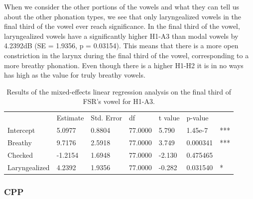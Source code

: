 \documentclass[12pt, letterpaper]{article}
\providecommand{\lsptoprule}{\midrule\toprule}
\providecommand{\lspbottomrule}{\bottomrule\midrule}
\begin{document}
When we consider the other portions of the vowels and what they can tell us about the other phonation types, we see that only laryngealized vowels in the final third of the vowel ever reach significance. In the final third of the vowel, laryngealized vowels have a significantly higher H1-A3 than modal vowels by 4.2392dB (SE = 1.9356, p = 0.03154). This means that there is a more open constriction in the larynx during the final third of the vowel, corresponding to a more breathy phonation. Even though there is a higher H1-H2 it is in no ways has high as the value for truly breathy vowels. 

\begin{table}[!h]
    \centering
    \caption{Results of the mixed-effects linear regression analysis on the final third of FSR's vowel for H1-A3. }
    \label{tab:FSR_H1A3_Third}
    \begin{tabular}{lllllll}
	\lsptoprule
					&  Estimate  & Std. Error & df & t value & p-value & \\
        Intercept       &   5.0977  & 0.8804 & 77.0000 &  5.790  &  1.45e-7 & *** \\  
  	Breathy   		&   9.7176  & 2.5918 & 77.0000 &  3.749  &  0.000341 & ***\\
	Checked    		&  -1.2154  & 1.6948 & 77.0000 & -2.130  &  0.475465 &  \\
	Laryngealized	&   4.2392  & 1.9356 & 77.0000 & -0.282  &  0.031540 & * \\
        \lspbottomrule
    \end{tabular}
\end{table}

\subsubsection{CPP}
\end{document}
